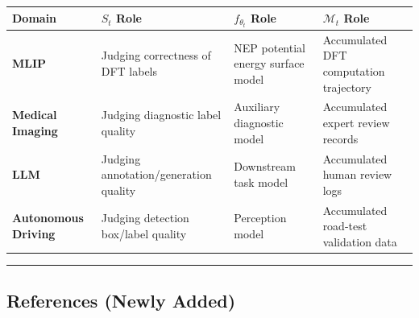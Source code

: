 \documentclass[
  12pt,
]{article}
\begin{document}
\begin{longtable}[]{@{}
  >{\raggedright\arraybackslash}p{}
  >{\raggedright\arraybackslash}p{}
  >{\raggedright\arraybackslash}p{}
  >{\raggedright\arraybackslash}p{}@{}}
\toprule\noalign{}
\begin{minipage}[b]{\linewidth}\raggedright
Domain
\end{minipage} & \begin{minipage}[b]{\linewidth}\raggedright
\(S_t\) Role
\end{minipage} & \begin{minipage}[b]{\linewidth}\raggedright
\(f_{\theta_t}\) Role
\end{minipage} & \begin{minipage}[b]{\linewidth}\raggedright
\(\mathcal{M}_t\) Role
\end{minipage} \\
\midrule\noalign{}
\endhead
\bottomrule\noalign{}
\endlastfoot
\textbf{MLIP} & Judging correctness of DFT labels & NEP potential energy surface model & Accumulated DFT computation trajectory \\
\textbf{Medical Imaging} & Judging diagnostic label quality & Auxiliary diagnostic model &
Accumulated expert review records \\
\textbf{LLM} & Judging annotation/generation quality & Downstream task model & Accumulated human review logs \\
\textbf{Autonomous Driving} & Judging detection box/label quality & Perception model &
Accumulated road-test validation data \\
\end{longtable}

\begin{center}\rule{0.5\linewidth}{0.5pt}\end{center}

\subsection{References (Newly Added)}\label{references}
\end{document}
